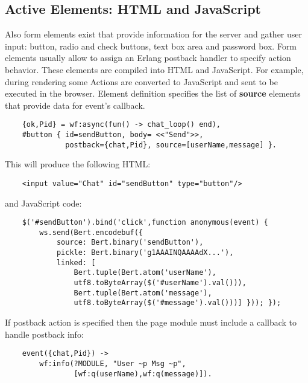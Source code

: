 \newpage
\subsection{Active Elements: HTML and JavaScript}
Also form elements exist that provide information for the server
and gather user input: button, radio and check buttons, text box area and password box.
Form elements usually allow to assign an Erlang postback handler to specify action behavior.
These elements are compiled into HTML and JavaScript. For example, during rendering some
Actions are converted to JavaScript and sent to be executed in the browser.
Element definition specifies the list of {\bf source} elements that provide data for event's callback.

\vspace{1\baselineskip}
\begin{lstlisting}
    {ok,Pid} = wf:async(fun() -> chat_loop() end),
    #button { id=sendButton, body= <<"Send">>, 
              postback={chat,Pid}, source=[userName,message] }.
\end{lstlisting}
\vspace{1\baselineskip}

This will produce the following HTML:
\begin{lstlisting}
    <input value="Chat" id="sendButton" type="button"/>
\end{lstlisting}
and JavaScript code:
\begin{lstlisting}
    $('#sendButton').bind('click',function anonymous(event) { 
        ws.send(Bert.encodebuf({
            source: Bert.binary('sendButton'), 
            pickle: Bert.binary('g1AAAINQAAAAdX...'),
            linked: [
                Bert.tuple(Bert.atom('userName'),
                utf8.toByteArray($('#userName').val())),
                Bert.tuple(Bert.atom('message'),
                utf8.toByteArray($('#message').val()))] })); });
\end{lstlisting}
\vspace{1\baselineskip}

If postback action is specified then the page module must include a callback to handle postback info:
\vspace{1\baselineskip}
\begin{lstlisting}
    event({chat,Pid}) ->
        wf:info(?MODULE, "User ~p Msg ~p", 
                [wf:q(userName),wf:q(message)]).
\end{lstlisting}
\vspace{1\baselineskip}

